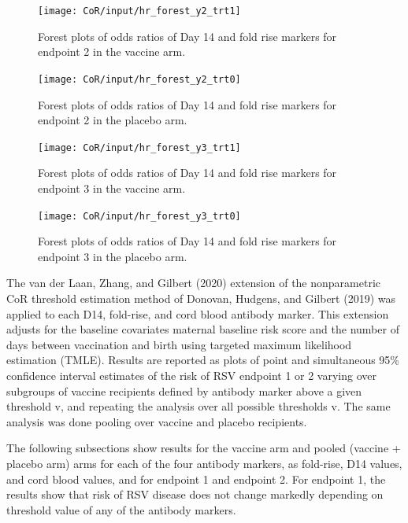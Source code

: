 \documentclass[11pt]{article}
\begin{document}
\begin{figure}[H]
    \centering
    \texttt{[image: CoR/input/hr\_forest\_y2\_trt1]}
    \caption{Forest plots of odds ratios of Day 14 and fold rise markers for endpoint 2 in the vaccine arm.}
    \label{hr_forest_y2_trt1}
\end{figure}
\begin{figure}[H]
    \centering
    \texttt{[image: CoR/input/hr\_forest\_y2\_trt0]}
    \caption{Forest plots of odds ratios of Day 14 and fold rise markers for endpoint 2 in the placebo arm.}
    \label{hr_forest_y2_trt0}
\end{figure}
\clearpage

\begin{figure}[H]
    \centering
    \texttt{[image: CoR/input/hr\_forest\_y3\_trt1]}
    \caption{Forest plots of odds ratios of Day 14 and fold rise markers for endpoint 3 in the vaccine arm.}
    \label{hr_forest_y3_trt1}
\end{figure}
\begin{figure}[H]
    \centering
    \texttt{[image: CoR/input/hr\_forest\_y3\_trt0]}
    \caption{Forest plots of odds ratios of Day 14 and fold rise markers for endpoint 3 in the placebo arm.}
    \label{hr_forest_y3_trt0}
\end{figure}
\clearpage

The van der Laan, Zhang, and Gilbert (2020) extension of the nonparametric CoR threshold estimation method of Donovan, Hudgens, and Gilbert (2019) was applied to each D14, fold-rise, and cord blood antibody marker. This extension adjusts for the baseline covariates maternal baseline risk score and the number of days between vaccination and birth using targeted maximum likelihood estimation (TMLE). Results are reported as plots of point and simultaneous 95\% confidence interval estimates of the risk of RSV endpoint 1 or 2 varying over subgroups of vaccine recipients defined by antibody marker above a given threshold v, and repeating the analysis over all possible thresholds v. The same analysis was done pooling over vaccine and placebo recipients.

The following subsections show results for the vaccine arm and pooled (vaccine + placebo arm) arms for each of the four antibody markers, as fold-rise, D14 values, and cord blood values, and for endpoint 1 and endpoint 2. For endpoint 1, the results show that risk of RSV disease does not change markedly depending on threshold value of any of the antibody markers.
\end{document}
